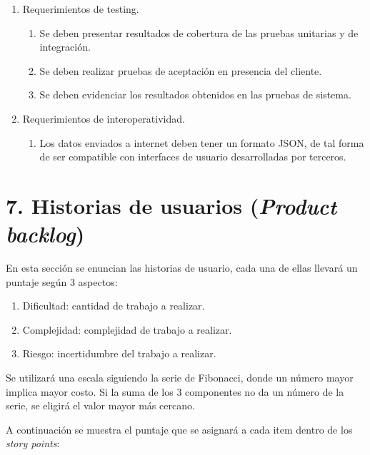\documentclass[
11pt, %
codirector, %
]{charter}
\begin{document}
\begin{enumerate}
	\item Requerimientos de testing.
		\begin{enumerate}
			\item Se deben presentar resultados de cobertura de las pruebas unitarias y de integración.
			\item Se deben realizar pruebas de aceptación en presencia del cliente.
			\item Se deben evidenciar los resultados obtenidos en las pruebas de sistema.
		\end{enumerate}

	\item Requerimientos de interoperatividad.
		\begin{enumerate}
			\item Los datos enviados a internet deben tener un formato JSON, de tal forma de ser compatible con interfaces de usuario desarrolladas por terceros.
		\end{enumerate}
					
\end{enumerate}

\section{7. Historias de usuarios (\textit{Product backlog})}
\label{sec:backlog}

En esta sección se enuncian las historias de usuario, cada una de ellas llevará un puntaje según 3 aspectos:
\begin{enumerate}
	\item Dificultad: cantidad de trabajo a realizar.
	\item Complejidad: complejidad de trabajo a realizar.
	\item Riesgo: incertidumbre del trabajo a realizar.
\end{enumerate}

Se utilizará una escala siguiendo la serie de Fibonacci, donde un número mayor implica mayor costo. Si la suma de los 3 componentes no da un número de la serie, se eligirá el valor mayor más cercano.

A continuación se muestra el puntaje que se asignará a cada item dentro de los \textit{story points}:
\end{document}
